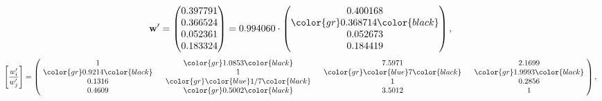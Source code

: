 \begin{example}
\begin{equation*}
\mathbf{w}^{\prime} =
\begin{pmatrix}
0.397791\\
0.366524\\
0.052361\\
0.183324
\end{pmatrix} =
0.994060\cdot
\begin{pmatrix}
0.400168\\
\color{gr} 0.368714\color{black} \\
0.052673\\
0.184419
\end{pmatrix},
\end{equation*}
\begin{equation*}
\left[ \frac{{w}^{\prime}_i}{{w}^{\prime}_j} \right] =
\begin{pmatrix}
$\,\,$ 1 $\,\,$ & $\,\,$\color{gr} 1.0853\color{black} $\,\,$ & $\,\,$7.5971$\,\,$ & $\,\,$2.1699$\,\,$ \\
$\,\,$\color{gr} 0.9214\color{black} $\,\,$ & $\,\,$ 1 $\,\,$ & $\,\,$\color{gr} \color{blue} 7\color{black} $\,\,$ & $\,\,$\color{gr} 1.9993\color{black}   $\,\,$ \\
$\,\,$0.1316$\,\,$ & $\,\,$\color{gr} \color{blue}  1/7\color{black} $\,\,$ & $\,\,$ 1 $\,\,$ & $\,\,$0.2856 $\,\,$ \\
$\,\,$0.4609$\,\,$ & $\,\,$\color{gr} 0.5002\color{black} $\,\,$ & $\,\,$3.5012$\,\,$ & $\,\,$ 1  $\,\,$ \\
\end{pmatrix},
\end{equation*}
\end{example}
\newpage
